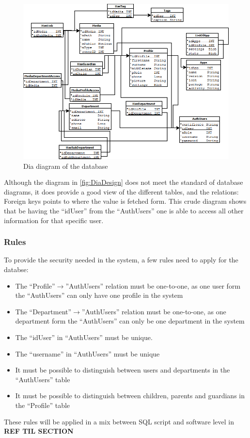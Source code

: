 \begin{figure}[htbp]
	\centering
		\includegraphics[width=1.00\textwidth]{images/DiaDesign.png}
	\caption{Dia diagram of the database}
	\label{fig:DiaDesign}
\end{figure}

Although the diagram in \autoref{fig:DiaDesign} does not meet the standard of database diagrams, it does provide a good view of the different tables, and the relations: Foreign keys points to where the value is fetched form. This crude diagram shows that be having the ``idUser'' from the ``AuthUsers'' one is able to access all other information for that specific user.

\subsubsection*{Rules}
To provide the security needed in the system, a few rules need to apply for the databse:
\begin{itemize}
	\item The ``Profile''$\rightarrow$''AuthUsers'' relation must be one-to-one, as one user form the ``AuthUsers'' can only have one profile in the system
	\item The ``Department''$\rightarrow$''AuthUsers'' relation must be one-to-one, as one department form the ``AuthUsers'' can only be one department in the system
	\item The ``idUser'' in ``AuthUsers'' must be unique.
	\item The ``username'' in ``AuthUsers'' must be unique
	\item It must be possible to distinguish between users and departments in the ``AuthUsers'' table
	\item It must be possible to distinguish between children, parents and guardians in the ``Profile'' table
\end{itemize}

These rules will be applied in a mix between SQL script and software level in \textbf{REF TIL SECTION}